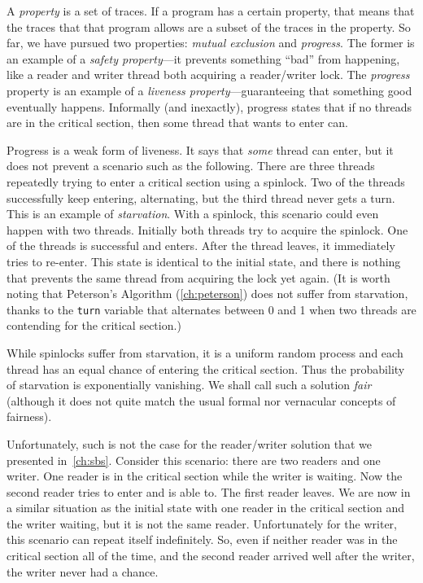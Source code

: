 \documentclass{report}
\begin{document}
{%

A \emph{property}
%
is a set of traces.
If a program has a certain property, that means that the traces that that
program allows are a subset of the traces in the property.
So far, we have pursued two properties: \emph{mutual exclusion}
and \emph{progress}.  The former is an example of a
\emph{safety property}---it prevents something ``bad'' from
happening, like a reader and writer thread both acquiring a
reader/writer lock.
The \emph{progress} property is an example
of a \emph{liveness property}---guaranteeing that something good
eventually happens.
Informally (and inexactly), progress states that if no threads
are in the critical section, then some thread that wants to enter
can.

Progress is a weak form of liveness.  It says that \emph{some}
thread can enter, but it does not prevent a scenario such as
the following.  There are three threads repeatedly trying to
enter a critical section using a spinlock.  Two of
the threads successfully keep entering, alternating, but the third
thread never gets a turn.  This is an example of
\emph{starvation}.  With a spinlock, this scenario could
even happen with two threads.  Initially both threads
try to acquire the spinlock.  One of the threads is
successful and enters.  After the thread leaves, it immediately
tries to re-enter.  This state is identical to the initial
state, and there is nothing that prevents the same thread
from acquiring the lock yet again.
%
(It is worth noting that Peterson's Algorithm (\autoref{ch:peterson})
does not suffer from starvation, thanks to the \texttt{turn} variable
that alternates between 0 and 1 when two threads are contending for
the critical section.)

While spinlocks suffer from starvation, it is a uniform random
process and each thread has an equal chance of entering the critical
section.  Thus the probability of starvation is exponentially vanishing.
We shall call such a solution \emph{fair}
%
(although it does not quite
match the usual formal nor vernacular concepts of fairness).

%

Unfortunately, such is not the case for the
reader/writer solution that we presented in~\autoref{ch:sbs}.
Consider this scenario: there are two readers and one writer.  One reader
is in the critical section while the writer is waiting.  Now the
second reader tries to enter and is able to.  The first reader leaves.
We are now in a similar situation as the initial state with one reader
in the critical section and the writer waiting, but it is not the same
reader.  Unfortunately for the writer, this scenario can repeat itself
indefinitely.  So, even if neither reader was in the critical section
all of the time, and the second reader arrived well after the writer,
the writer never had a chance.

}
\end{document}
